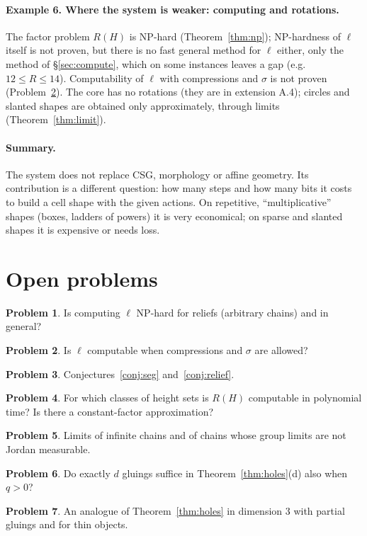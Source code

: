 \documentclass[11pt,a4paper]{article}
\theoremstyle{plain}
\theoremstyle{definition}
\newtheorem{problem}{Problem}
\theoremstyle{remark}
\begin{document}
\paragraph{Example 6. Where the system is weaker: computing and rotations.} The factor problem $R(H)$ is NP-hard (Theorem~\ref{thm:np}); NP-hardness of $\ell$ itself is not proven, but there is no fast general method for $\ell$ either, only the method of §\ref{sec:compute}, which on some instances leaves a gap (e.g.\ $12\le R\le14$). Computability of $\ell$ with compressions and $\sigma$ is not proven (Problem~\ref{pr:dec}). The core has no rotations (they are in extension A.4); circles and slanted shapes are obtained only approximately, through limits (Theorem~\ref{thm:limit}).

\paragraph{Summary.} The system does not replace CSG, morphology or affine geometry. Its contribution is a different question: how many steps and how many bits it costs to build a cell shape with the given actions. On repetitive, ``multiplicative'' shapes (boxes, ladders of powers) it is very economical; on sparse and slanted shapes it is expensive or needs loss.

\section{Open problems}

\begin{problem}\label{pr:np}
Is computing $\ell$ NP-hard for reliefs (arbitrary chains) and in general?
\end{problem}
\begin{problem}\label{pr:dec}
Is $\ell$ computable when compressions and $\sigma$ are allowed?
\end{problem}
\begin{problem}
Conjectures~\ref{conj:seg} and~\ref{conj:relief}.
\end{problem}
\begin{problem}
For which classes of height sets is $R(H)$ computable in polynomial time? Is there a constant-factor approximation?
\end{problem}
\begin{problem}
Limits of infinite chains and of chains whose group limits are not Jordan measurable.
\end{problem}
\begin{problem}
Do exactly $d$ gluings suffice in Theorem~\ref{thm:holes}(d) also when $q>0$?
\end{problem}
\begin{problem}
An analogue of Theorem~\ref{thm:holes} in dimension 3 with partial gluings and for thin objects.
\end{problem}
\end{document}
